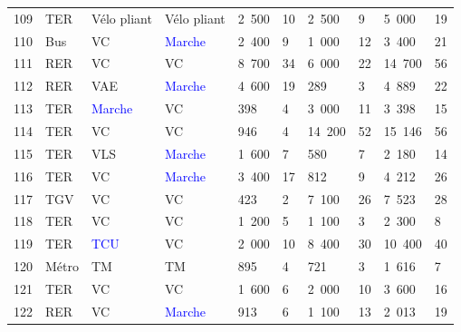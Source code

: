 \begin{longtable}{p{0.7cm}p{1.4cm}p{1.4cm}p{1.6cm}p{0.8cm}p{0.8cm}p{0.8cm}p{0.8cm}p{1.1cm}p{1.1cm}}
    \small{109} & \small{TER} & \small{Vélo pliant} & \small{Vélo pliant} & \small{2~500} & \small{10} & \small{2~500} & \small{9} & \small{5~000} & \small{19}\\
    \small{110} & \small{Bus} & \small{VC} & \small{\textcolor{blue}{Marche}} & \small{2~400} & \small{9} & \small{1~000} & \small{12} & \small{3~400} & \small{21}\\
    \small{111} & \small{RER} & \small{VC} & \small{VC} & \small{8~700} & \small{34} & \small{6~000} & \small{22} & \small{14~700} & \small{56}\\
    \small{112} & \small{RER} & \small{VAE} & \small{\textcolor{blue}{Marche}} & \small{4~600} & \small{19} & \small{289} & \small{3} & \small{4~889} & \small{22}\\
    \small{113} & \small{TER} & \small{\textcolor{blue}{Marche}} & \small{VC} & \small{398} & \small{4} & \small{3~000} & \small{11} & \small{3~398} & \small{15}\\
    \small{114} & \small{TER} & \small{VC} & \small{VC} & \small{946} & \small{4} & \small{14~200} & \small{52} & \small{15~146} & \small{56}\\
    \small{115} & \small{TER} & \small{VLS} & \small{\textcolor{blue}{Marche}} & \small{1~600} & \small{7} & \small{580} & \small{7} & \small{2~180} & \small{14}\\
    \small{116} & \small{TER} & \small{VC} & \small{\textcolor{blue}{Marche}} & \small{3~400} & \small{17} & \small{812} & \small{9} & \small{4~212} & \small{26}\\
    \small{117} & \small{TGV} & \small{VC} & \small{VC} & \small{423} & \small{2} & \small{7~100} & \small{26} & \small{7~523} & \small{28}\\
    \small{118} & \small{TER} & \small{VC} & \small{VC} & \small{1~200} & \small{5} & \small{1~100} & \small{3} & \small{2~300} & \small{8}\\
    \small{119} & \small{TER} & \small{\textcolor{blue}{TCU}} & \small{VC} & \small{2~000} & \small{10} & \small{8~400} & \small{30} & \small{10~400} & \small{40}\\
    \small{120} & \small{Métro} & \small{TM} & \small{TM} & \small{895} & \small{4} & \small{721} & \small{3} & \small{1~616} & \small{7}\\
    \small{121} & \small{TER} & \small{VC} & \small{VC} & \small{1~600} & \small{6} & \small{2~000} & \small{10} & \small{3~600} & \small{16}\\
    \small{122} & \small{RER} & \small{VC} & \small{\textcolor{blue}{Marche}} & \small{913} & \small{6} & \small{1~100} & \small{13} & \small{2~013} & \small{19}\\

\end{longtable}
